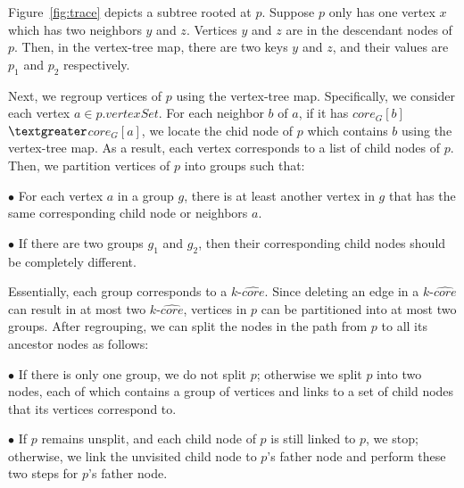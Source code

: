 \begin{example}
\label{em:reorganize}
Figure~\ref{fig:trace} depicts a subtree rooted at $p$.
Suppose $p$ only has one vertex $x$ which has two neighbors $y$ and $z$.
Vertices $y$ and $z$ are in the descendant nodes of $p$.
Then, in the vertex-tree map, there are two keys $y$ and $z$,
and their values are $p_1$ and $p_2$ respectively.
\end{example}

Next, we regroup vertices of $p$ using the vertex-tree map.
Specifically, we consider each vertex $a$$\in p.vertexSet$.
For each neighbor $b$ of $a$, if it has $core_G[b]$$\textgreater$$core_G[a]$,
we locate the chid node of $p$ which contains $b$ using the vertex-tree map.
As a result, each vertex corresponds to a list of child nodes of $p$.
Then, we partition vertices of $p$ into groups such that:

\noindent $\bullet$ For each vertex $a$ in a group $g$,
there is at least another vertex in $g$ that has the same corresponding child node or neighbors $a$.

\noindent $\bullet$ If there are two groups $g_1$ and $g_2$, then their corresponding
child nodes should be completely different.


Essentially, each group corresponds to a $k$-$\widehat{core}$.
Since deleting an edge in a $k$-$\widehat{core}$ can result in at most two $k$-$\widehat{core}$,
vertices in $p$ can be partitioned into at most two groups.
After regrouping, we can split the nodes in the path from $p$ to all its ancestor nodes as follows:

\noindent $\bullet$ If there is only one group, we do not split $p$; otherwise we split $p$ into two nodes, each of which contains a group of vertices and links to a set of child nodes that its vertices correspond to.

\noindent $\bullet$ If $p$ remains unsplit, and each child node of $p$ is still linked to $p$, we stop; otherwise, we link the unvisited child node to $p$'s father node and perform these two steps for $p$'s father node.

